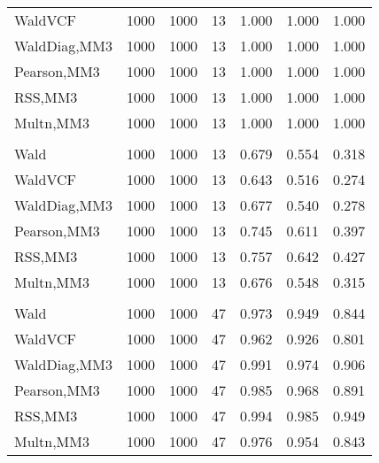 \documentclass[
]{article}
\begin{document}
\begin{table}[H]
{\begin{tabular}[t]{lrrrrrr}
\hspace{1em}WaldVCF & 1000 & 1000 & 13 & 1.000 & 1.000 & 1.000\\
\hspace{1em}WaldDiag,MM3 & 1000 & 1000 & 13 & 1.000 & 1.000 & 1.000\\
\hspace{1em}Pearson,MM3 & 1000 & 1000 & 13 & 1.000 & 1.000 & 1.000\\
\hspace{1em}RSS,MM3 & 1000 & 1000 & 13 & 1.000 & 1.000 & 1.000\\
\hspace{1em}Multn,MM3 & 1000 & 1000 & 13 & 1.000 & 1.000 & 1.000\\
\addlinespace[0.3em]
\multicolumn{7}{l}{\textbf{2F 10V}}\\
\hspace{1em}Wald & 1000 & 1000 & 13 & 0.679 & 0.554 & 0.318\\
\hspace{1em}WaldVCF & 1000 & 1000 & 13 & 0.643 & 0.516 & 0.274\\
\hspace{1em}WaldDiag,MM3 & 1000 & 1000 & 13 & 0.677 & 0.540 & 0.278\\
\hspace{1em}Pearson,MM3 & 1000 & 1000 & 13 & 0.745 & 0.611 & 0.397\\
\hspace{1em}RSS,MM3 & 1000 & 1000 & 13 & 0.757 & 0.642 & 0.427\\
\hspace{1em}Multn,MM3 & 1000 & 1000 & 13 & 0.676 & 0.548 & 0.315\\
\addlinespace[0.3em]
\multicolumn{7}{l}{\textbf{3F 15V}}\\
\hspace{1em}Wald & 1000 & 1000 & 47 & 0.973 & 0.949 & 0.844\\
\hspace{1em}WaldVCF & 1000 & 1000 & 47 & 0.962 & 0.926 & 0.801\\
\hspace{1em}WaldDiag,MM3 & 1000 & 1000 & 47 & 0.991 & 0.974 & 0.906\\
\hspace{1em}Pearson,MM3 & 1000 & 1000 & 47 & 0.985 & 0.968 & 0.891\\
\hspace{1em}RSS,MM3 & 1000 & 1000 & 47 & 0.994 & 0.985 & 0.949\\
\hspace{1em}Multn,MM3 & 1000 & 1000 & 47 & 0.976 & 0.954 & 0.843\\
\bottomrule
\end{tabular}}
\endgroup{}
\end{table}
\end{document}
